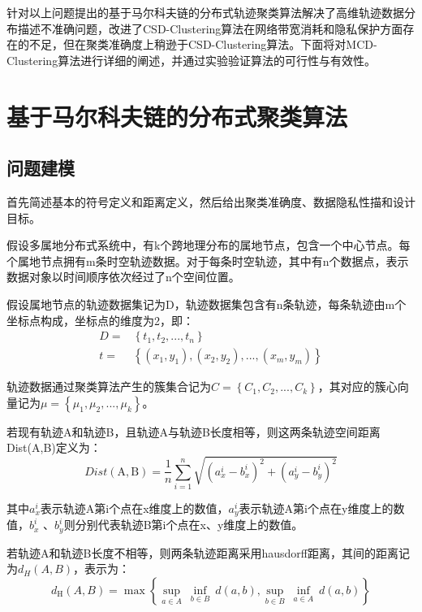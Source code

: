 针对以上问题提出的基于马尔科夫链的分布式轨迹聚类算法解决了高维轨迹数据分布描述不准确问题，改进了CSD-Clustering算法在网络带宽消耗和隐私保护方面存在的不足，但在聚类准确度上稍逊于CSD-Clustering算法。下面将对MCD-Clustering算法进行详细的阐述，并通过实验验证算法的可行性与有效性。

\section{基于马尔科夫链的分布式聚类算法}

\subsection{问题建模}

首先简述基本的符号定义和距离定义，然后给出聚类准确度、数据隐私性描和设计目标。

假设多属地分布式系统中，有k个跨地理分布的属地节点，包含一个中心节点。每个属地节点拥有m条时空轨迹数据。对于每条时空轨迹，其中有n个数据点，表示数据对象以时间顺序依次经过了n个空间位置。

假设属地节点的轨迹数据集记为D，轨迹数据集包含有n条轨迹，每条轨迹由m个坐标点构成，坐标点的维度为2，即：
\[
\begin{aligned}
D=&\left\{ t_1,t_2,...,t_n \right\} 
\\
t=&\left\{ \left( x_1,y_1 \right) ,\left( x_2,y_2 \right) ,...,\left( x_m,y_m \right) \right\} 
\end{aligned}
\]

轨迹数据通过聚类算法产生的簇集合记为$C=\left\{ C_1,C_2,...,C_k \right\} $，其对应的簇心向量记为$\mu =\left\{ \mu _1,\mu _2,...,\mu _k \right\} $。

若现有轨迹A和轨迹B，且轨迹A与轨迹B长度相等，则这两条轨迹空间距离Dist(A,B)定义为：
\begin{equation}
\label{ch4dist}
Dist(\mathrm{A}, \mathrm{B})=\frac{1}{n} \sum_{i=1}^{n} \sqrt{\left(a_{x}^{i}-b_{x}^{i}\right)^{2}+\left(a_{y}^{i}-b_{y}^{i}\right)^{2}}
\end{equation}

其中$a_x^i$表示轨迹A第i个点在x维度上的数值，$a_y^i$表示轨迹A第i个点在y维度上的数值，$b_x^i$ 、$b_y^i$则分别代表轨迹B第i个点在x、y维度上的数值。	

若轨迹A和轨迹B长度不相等，则两条轨迹距离采用hausdorff距离，其间的距离记为$d_H(A,B)$，表示为：
\begin{equation}
\label{hausdorffdist}
d_{\text{H}}\left( A,B \right) =\max \left\{ \mathop{sup}_{a\in A}\ \mathop{inf}_{b\in B}\ d\left( a,b \right) ,\mathop{sup}_{b\in B}\ \mathop{inf}_{a\in A}\ d\left( a,b \right) \right\} 
\end{equation}

